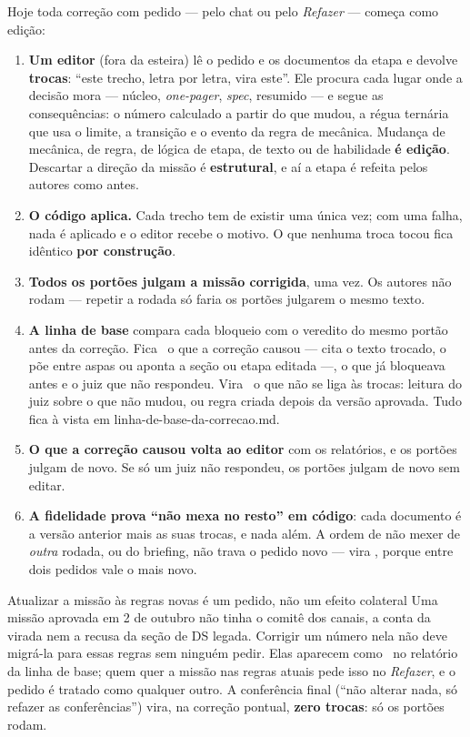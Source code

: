 \documentclass[11pt,a4paper]{article}
\newcommand{\cod}[1]{{\ttfamily\small #1}}
\newcommand{\bolinha}[1]{\tikz[baseline=-0.5ex]{\fill[#1] (0,0) circle (0.33em);}}
\newcommand{\statusAmbar}{\bolinha{sinalAmbar}}
\newcommand{\statusVermelho}{\bolinha{sinalVermelho}}
\begin{document}
Hoje toda correção com pedido --- pelo chat ou pelo \emph{Refazer} --- começa como edição:

\begin{enumerate}
  \item \textbf{Um editor} (fora da esteira) lê o pedido e os documentos da etapa e devolve \textbf{trocas}: ``este trecho, letra por letra, vira este''. Ele procura cada lugar onde a decisão mora --- núcleo, \emph{one-pager}, \emph{spec}, resumido --- e segue as consequências: o número calculado a partir do que mudou, a régua ternária que usa o limite, a transição e o evento da regra de mecânica. Mudança de mecânica, de regra, de lógica de etapa, de texto ou de habilidade \textbf{é edição}. Descartar a direção da missão é \textbf{estrutural}, e aí a etapa é refeita pelos autores como antes.
  \item \textbf{O código aplica.} Cada trecho tem de existir uma única vez; com uma falha, nada é aplicado e o editor recebe o motivo. O que nenhuma troca tocou fica idêntico \textbf{por construção}.
  \item \textbf{Todos os portões julgam a missão corrigida}, uma vez. Os autores não rodam --- repetir a rodada só faria os portões julgarem o mesmo texto.
  \item \textbf{A linha de base} compara cada bloqueio com o veredito do mesmo portão antes da correção. Fica \statusVermelho\ o que a correção causou --- cita o texto trocado, o põe entre aspas ou aponta a seção ou etapa editada ---, o que já bloqueava antes e o juiz que não respondeu. Vira \statusAmbar\ o que não se liga às trocas: leitura do juiz sobre o que não mudou, ou regra criada depois da versão aprovada. Tudo fica à vista em \cod{linha-de-base-da-correcao.md}.
  \item \textbf{O que a correção causou volta ao editor} com os relatórios, e os portões julgam de novo. Se só um juiz não respondeu, os portões julgam de novo sem editar.
  \item \textbf{A fidelidade prova ``não mexa no resto'' em código}: cada documento é a versão anterior mais as suas trocas, e nada além. A ordem de não mexer de \emph{outra} rodada, ou do briefing, não trava o pedido novo --- vira \statusAmbar, porque entre dois pedidos vale o mais novo.
\end{enumerate}

\begin{caixaConceito}{Atualizar a missão às regras novas é um pedido, não um efeito colateral}
Uma missão aprovada em 2 de outubro não tinha o comitê dos canais, a conta da virada nem a recusa da seção de DS legada. Corrigir um número nela não deve migrá-la para essas regras sem ninguém pedir. Elas aparecem como \statusAmbar\ no relatório da linha de base; quem quer a missão nas regras atuais pede isso no \emph{Refazer}, e o pedido é tratado como qualquer outro. A conferência final (``não alterar nada, só refazer as conferências'') vira, na correção pontual, \textbf{zero trocas}: só os portões rodam.
\end{caixaConceito}
\end{document}

